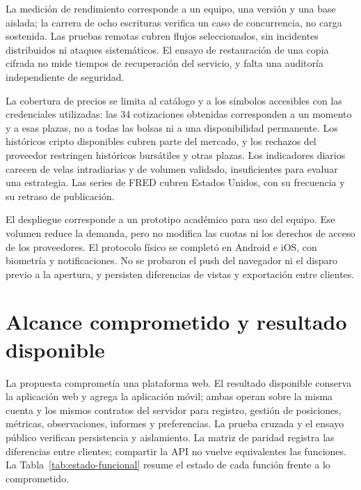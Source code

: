 La medición de rendimiento corresponde a un equipo, una versión y una base aislada; la carrera de ocho escrituras verifica un caso de concurrencia, no carga sostenida. Las pruebas remotas cubren flujos seleccionados, sin incidentes distribuidos ni ataques sistemáticos. El ensayo de restauración de una copia cifrada no mide tiempos de recuperación del servicio, y falta una auditoría independiente de seguridad.

La cobertura de precios se limita al catálogo y a los símbolos accesibles con las credenciales utilizadas: las 34 cotizaciones obtenidas corresponden a un momento y a esas plazas, no a todas las bolsas ni a una disponibilidad permanente. Los históricos cripto disponibles cubren parte del mercado, y los rechazos del proveedor restringen históricos bursátiles y otras plazas. Los indicadores diarios carecen de velas intradiarias y de volumen validado, insuficientes para evaluar una estrategia. Las series de FRED cubren Estados Unidos, con su frecuencia y su retraso de publicación.

El despliegue corresponde a un prototipo académico para uso del equipo. Ese volumen reduce la demanda, pero no modifica las cuotas ni los derechos de acceso de los proveedores. El protocolo físico se completó en Android e iOS, con biometría y notificaciones. No se probaron el push del navegador ni el disparo previo a la apertura, y persisten diferencias de vistas y exportación entre clientes.

\section{Alcance comprometido y resultado disponible}\label{sec:alcance-vs-resultado}

La propuesta comprometía una plataforma web. El resultado disponible conserva la aplicación web y agrega la aplicación móvil; ambas operan sobre la misma cuenta y los mismos contratos del servidor para registro, gestión de posiciones, métricas, observaciones, informes y preferencias. La prueba cruzada y el ensayo público verifican persistencia y aislamiento. La matriz de paridad registra las diferencias entre clientes; compartir la API no vuelve equivalentes las funciones. La Tabla~\ref{tab:estado-funcional} resume el estado de cada función frente a lo comprometido.

